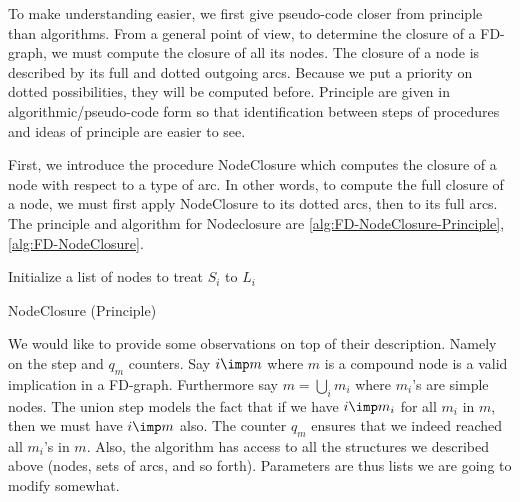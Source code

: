 \noindent To make understanding easier, we first give pseudo-code closer from
principle than algorithms. From a general point of view, to determine the 
closure of a FD-graph, we must compute the closure of all its nodes. The 
closure of a node is described by its full and dotted outgoing arcs. Because we
put a priority on dotted possibilities, they will be computed before. Principle
are given in algorithmic/pseudo-code form so that identification between steps
of procedures and ideas of principle are easier to see.

\vspace{1.2em}

First, we introduce the procedure NodeClosure which computes the closure of a
node with respect to a type of arc. In other words, to compute the full closure
of a node, we must first apply NodeClosure to its dotted arcs, then to its full
arcs. The principle and algorithm for Nodeclosure are 
\ref{alg:FD-NodeClosure-Principle}, \ref{alg:FD-NodeClosure}. 

\vspace{1.2em}

\begin{algorithm}

\BlankLine
\BlankLine

Initialize a list of nodes to treat $S_i$ to $L_i$ \;


\caption{NodeClosure (Principle)}
\label{alg:FD-NodeClosure-Principle}
\end{algorithm}

We would like to provide some observations on top of their description. Namely 
on the  step and $q_m$ counters. Say $i \imp m$ where $m$ is a 
compound node is a valid implication in a FD-graph. Furthermore say $m = 
\bigcup_i m_i$ where $m_i$'s are simple nodes. The union step models the fact 
that if we have $i \imp m_i$ for all $m_i$ in $m$, then we must have $i \imp m$ 
also. The counter $q_m$ ensures that we indeed reached all $m_i$'s in $m$. 
Also, the algorithm has access to all the structures we described above (nodes, 
sets of arcs, and so forth). Parameters are thus lists we are going to modify 
somewhat.

